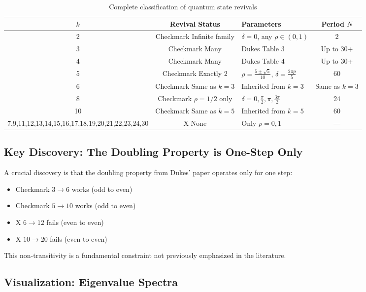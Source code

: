\documentclass[12pt]{article}
\begin{document}
\begin{table}[h!]
\centering
\caption{Complete classification of quantum state revivals}
\label{tab:complete}
\begin{tabular}{cclc}
\toprule
\(k\) & Revival Status & Parameters & Period \(N\) \\
\midrule
2 & Checkmark Infinite family & \(\delta = 0\), any \(\rho \in (0,1)\) & 2 \\
3 & Checkmark Many & Dukes Table 3 & Up to 30+ \\
4 & Checkmark Many & Dukes Table 4 & Up to 30+ \\
5 & Checkmark Exactly 2 & \(\rho = \frac{5\pm\sqrt{5}}{10}\), \(\delta = \frac{2\pi p}{5}\) & 60 \\
6 & Checkmark Same as \(k=3\) & Inherited from \(k=3\) & Same as \(k=3\) \\
8 & Checkmark \(\rho = 1/2\) only & \(\delta = 0, \frac{\pi}{2}, \pi, \frac{3\pi}{2}\) & 24 \\
10 & Checkmark Same as \(k=5\) & Inherited from \(k=5\) & 60 \\
\midrule
7,9,11,12,13,14,15,16,17,18,19,20,21,22,23,24,30 & X None & Only \(\rho = 0, 1\) & --- \\
\bottomrule
\end{tabular}
\end{table}

\subsection{Key Discovery: The Doubling Property is One-Step Only}

A crucial discovery is that the doubling property from Dukes' paper operates only for one step:

\begin{itemize}
    \item Checkmark \(3 \to 6\) works (odd to even)
    \item Checkmark \(5 \to 10\) works (odd to even)
    \item X \(6 \to 12\) fails (even to even)
    \item X \(10 \to 20\) fails (even to even)
\end{itemize}

This non-transitivity is a fundamental constraint not previously emphasized in the literature.

\subsection{Visualization: Eigenvalue Spectra}
\end{document}
